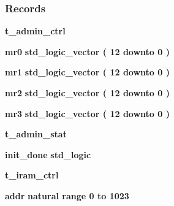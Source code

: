 \subsubsection*{Records}
 \begin{DoxyCompactItemize}
\item 
{\bf t\+\_\+admin\+\_\+ctrl} {\bfseries  }
\item 
{\bf mr0} {\bfseries {\bfseries \textcolor{comment}{std\+\_\+logic\+\_\+vector}\textcolor{vhdlchar}{ }\textcolor{vhdlchar}{(}\textcolor{vhdlchar}{ }\textcolor{vhdlchar}{ } \textcolor{vhdldigit}{12} \textcolor{vhdlchar}{ }\textcolor{keywordflow}{downto}\textcolor{vhdlchar}{ }\textcolor{vhdlchar}{ } \textcolor{vhdldigit}{0} \textcolor{vhdlchar}{ }\textcolor{vhdlchar}{)}\textcolor{vhdlchar}{ }}} 
\item 
{\bf mr1} {\bfseries {\bfseries \textcolor{comment}{std\+\_\+logic\+\_\+vector}\textcolor{vhdlchar}{ }\textcolor{vhdlchar}{(}\textcolor{vhdlchar}{ }\textcolor{vhdlchar}{ } \textcolor{vhdldigit}{12} \textcolor{vhdlchar}{ }\textcolor{keywordflow}{downto}\textcolor{vhdlchar}{ }\textcolor{vhdlchar}{ } \textcolor{vhdldigit}{0} \textcolor{vhdlchar}{ }\textcolor{vhdlchar}{)}\textcolor{vhdlchar}{ }}} 
\item 
{\bf mr2} {\bfseries {\bfseries \textcolor{comment}{std\+\_\+logic\+\_\+vector}\textcolor{vhdlchar}{ }\textcolor{vhdlchar}{(}\textcolor{vhdlchar}{ }\textcolor{vhdlchar}{ } \textcolor{vhdldigit}{12} \textcolor{vhdlchar}{ }\textcolor{keywordflow}{downto}\textcolor{vhdlchar}{ }\textcolor{vhdlchar}{ } \textcolor{vhdldigit}{0} \textcolor{vhdlchar}{ }\textcolor{vhdlchar}{)}\textcolor{vhdlchar}{ }}} 
\item 
{\bf mr3} {\bfseries {\bfseries \textcolor{comment}{std\+\_\+logic\+\_\+vector}\textcolor{vhdlchar}{ }\textcolor{vhdlchar}{(}\textcolor{vhdlchar}{ }\textcolor{vhdlchar}{ } \textcolor{vhdldigit}{12} \textcolor{vhdlchar}{ }\textcolor{keywordflow}{downto}\textcolor{vhdlchar}{ }\textcolor{vhdlchar}{ } \textcolor{vhdldigit}{0} \textcolor{vhdlchar}{ }\textcolor{vhdlchar}{)}\textcolor{vhdlchar}{ }}} 
\item 
{\bf t\+\_\+admin\+\_\+stat} {\bfseries  }
\item 
{\bf init\+\_\+done} {\bfseries {\bfseries \textcolor{comment}{std\+\_\+logic}\textcolor{vhdlchar}{ }}} 
\item 
{\bf t\+\_\+iram\+\_\+ctrl} {\bfseries  }
\item 
{\bf addr} {\bfseries {\bfseries \textcolor{comment}{natural}\textcolor{vhdlchar}{ }\textcolor{vhdlchar}{ }\textcolor{vhdlchar}{ }\textcolor{keywordflow}{range}\textcolor{vhdlchar}{ }\textcolor{vhdlchar}{ } \textcolor{vhdldigit}{0} \textcolor{vhdlchar}{ }\textcolor{keywordflow}{to}\textcolor{vhdlchar}{ }\textcolor{vhdlchar}{ } \textcolor{vhdldigit}{1023} \textcolor{vhdlchar}{ }}} 

\end{DoxyCompactItemize}
